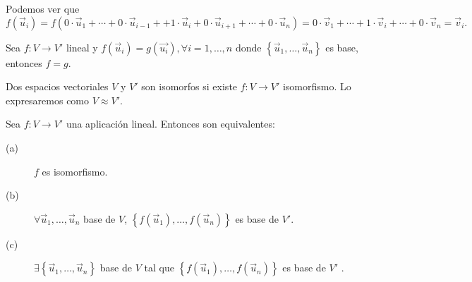 Podemos ver que
\[f\left(\vec{u}_{i}\right) = f\left(0 \cdot \vec{u}_{1} + \cdots + 0 \cdot \vec{u}_{i-1}+ + 1 \cdot \vec{u}_{i} + 0 \cdot \vec{u}_{i+1} + \cdots + 0 \cdot \vec{u}_{n}\right) = 0 \cdot \vec{v}_{1} + \cdots + 1 \cdot \vec{v}_{i} + \cdots + 0 \cdot \vec{v}_{n} = \vec{v}_{i} .\]

\begin{fcolorary}[]
	\normalfont Sea $\displaystyle f: V \to V' $ lineal y $\displaystyle f\left(\vec{u}_{i}\right) = g\left(\vec{u_{i}}\right), \forall i = 1, \ldots, n $ donde $\displaystyle \left\{ \vec{u}_{1}, \ldots, \vec{u}_{n}\right\}  $ es base, entonces $\displaystyle f = g $.
\end{fcolorary}

\begin{fdefinition}[]
\normalfont Dos espacios vectoriales $\displaystyle V $ y $\displaystyle V' $ son isomorfos si existe $\displaystyle f: V \to V' $ isomorfismo. Lo expresaremos como $\displaystyle V \approx V' $.
\end{fdefinition}

\begin{ftheorem}[]
\normalfont Sea $\displaystyle f: V \to V' $ una aplicación lineal. Entonces son equivalentes:
\begin{description}
\item[(a)] $\displaystyle f $ es isomorfismo.
\item[(b)] $\displaystyle \forall \vec{u}_{1}, \ldots, \vec{u}_{n} $ base de $\displaystyle V $, $\displaystyle \left\{ f\left(\vec{u}_{1}\right), \ldots, f\left(\vec{u}_{n}\right)\right\}  $ es base de $\displaystyle V' $.
\item[(c)] $\displaystyle \exists \left\{ \vec{u}_{1}, \ldots, \vec{u}_{n}\right\}  $ base de $\displaystyle V $ tal que $\displaystyle \left\{ f\left(\vec{u}_{1}\right), \ldots, f\left(\vec{u}_{n}\right)\right\}  $ es base de $\displaystyle V' $ .
\end{description}
\end{ftheorem}

